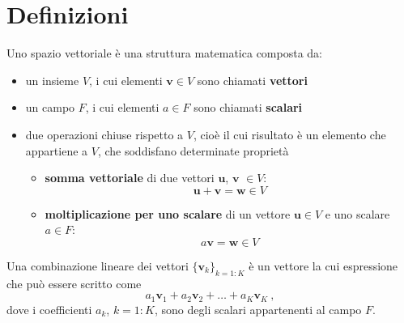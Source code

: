\section{Definizioni}
\begin{definition} Uno spazio vettoriale è una struttura matematica composta da:
    \begin{itemize}
        \item un insieme $V$, i cui elementi $\mathbf{v} \in V$ sono chiamati \textbf{vettori}
        \item un campo $F$, i cui elementi $a \in F$ sono chiamati \textbf{scalari}
        \item due operazioni chiuse rispetto a $V$, cioè il cui risultato è un elemento che appartiene a $V$, che soddisfano determinate proprietà
        \begin{itemize}
            \item \textbf{somma vettoriale} di due vettori $\mathbf{u}$, $\mathbf{v}$ $\in V$: 
                \begin{equation}
                    \mathbf{u} + \mathbf{v} = \mathbf{w} \in V
                \end{equation}
            \item \textbf{moltiplicazione per uno scalare} di un vettore $\mathbf{u} \in V$ e uno scalare $a \in F$:
                \begin{equation}
                    a \mathbf{v} = \mathbf{w} \in V
                \end{equation}
        \end{itemize}
    \end{itemize}
\end{definition}

\begin{property}
\end{property}

\begin{definition} Una combinazione lineare dei vettori $\{ \mathbf{v}_k \}_{k=1:K}$ è un vettore la cui espressione che può essere scritto come
    \begin{equation}
        a_1 \mathbf{v}_1 + a_2 \mathbf{v}_2 + \dots + a_K \mathbf{v}_K \ , 
    \end{equation}
    dove i coefficienti $a_k$, $k=1:K$, sono degli scalari appartenenti al campo $F$.
\end{definition}


